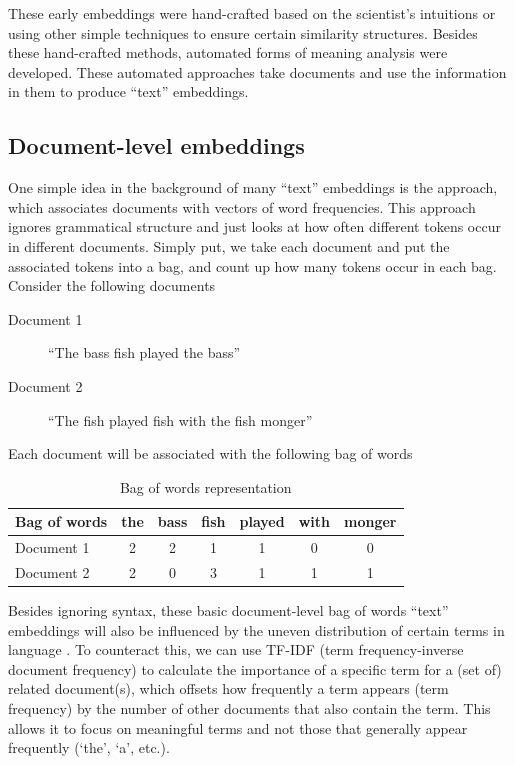 These early embeddings were hand-crafted based on the scientist's intuitions or using other simple techniques to ensure certain similarity structures. Besides these hand-crafted methods, automated forms of meaning analysis were developed. These automated approaches take documents and use the information in them to produce ``text'' embeddings.


\subsection{Document-level embeddings}

One simple idea in the background of many ``text'' embeddings is the  approach, which associates documents with vectors of word frequencies. This approach ignores grammatical structure and just looks at how often different tokens occur in different documents. 
Simply put, we take each document and put the associated tokens into a bag, and count up how many tokens occur in each bag. Consider the following documents

\begin{description}
\item[Document 1]  ``The bass fish played the bass''
\item[Document 2]  ``The fish played fish with the fish monger''
\end{description}

Each document will be associated with the following bag of words

\begin{table}[h]
    \centering
    \begin{tabular}{|l|c|c|c|c|c|c|}
    \hline
    Bag of words & the & bass & fish & played & with & monger \\
    \hline
    Document 1 & 2 & 2 & 1 & 1 & 0 & 0 \\
    Document 2 & 2 & 0 & 3 & 1 & 1 & 1 \\
    \hline
    \end{tabular}
    \caption{Bag of words representation}
\end{table}

Besides ignoring syntax, these basic document-level bag of words ``text'' embeddings will also be influenced by the uneven distribution of certain terms in language \cite{piantadosi2014zipf, zipf1945meaning}.
To counteract this, we can use TF-IDF (term frequency-inverse document frequency) to calculate the importance of a specific term for a (set of) related document(s), which offsets how frequently a term appears (term frequency) by the number of other documents that also contain the term. This allows it to focus on meaningful terms and not those that generally appear frequently (`the', `a', etc.). 


